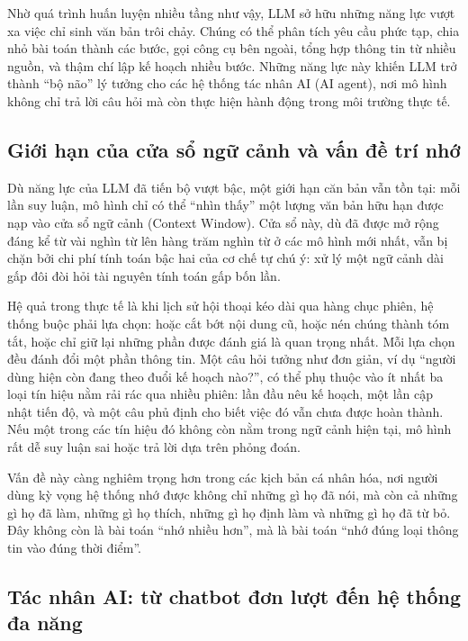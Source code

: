 \documentclass[../main.tex]{subfiles}
\begin{document}
Nhờ quá trình huấn luyện nhiều tầng như vậy, LLM sở hữu những năng lực vượt xa việc chỉ sinh văn bản trôi chảy. Chúng có thể phân tích yêu cầu phức tạp, chia nhỏ bài toán thành các bước, gọi công cụ bên ngoài, tổng hợp thông tin từ nhiều nguồn, và thậm chí lập kế hoạch nhiều bước. Những năng lực này khiến LLM trở thành ``bộ não'' lý tưởng cho các hệ thống tác nhân AI (AI agent), nơi mô hình không chỉ trả lời câu hỏi mà còn thực hiện hành động trong môi trường thực tế.

\subsection{Giới hạn của cửa sổ ngữ cảnh và vấn đề trí nhớ}

Dù năng lực của LLM đã tiến bộ vượt bậc, một giới hạn căn bản vẫn tồn tại: mỗi lần suy luận, mô hình chỉ có thể ``nhìn thấy'' một lượng văn bản hữu hạn được nạp vào cửa sổ ngữ cảnh (Context Window). Cửa sổ này, dù đã được mở rộng đáng kể từ vài nghìn từ lên hàng trăm nghìn từ ở các mô hình mới nhất, vẫn bị chặn bởi chi phí tính toán bậc hai của cơ chế tự chú ý: xử lý một ngữ cảnh dài gấp đôi đòi hỏi tài nguyên tính toán gấp bốn lần.

Hệ quả trong thực tế là khi lịch sử hội thoại kéo dài qua hàng chục phiên, hệ thống buộc phải lựa chọn: hoặc cắt bớt nội dung cũ, hoặc nén chúng thành tóm tắt, hoặc chỉ giữ lại những phần được đánh giá là quan trọng nhất. Mỗi lựa chọn đều đánh đổi một phần thông tin. Một câu hỏi tưởng như đơn giản, ví dụ ``người dùng hiện còn đang theo đuổi kế hoạch nào?'', có thể phụ thuộc vào ít nhất ba loại tín hiệu nằm rải rác qua nhiều phiên: lần đầu nêu kế hoạch, một lần cập nhật tiến độ, và một câu phủ định cho biết việc đó vẫn chưa được hoàn thành. Nếu một trong các tín hiệu đó không còn nằm trong ngữ cảnh hiện tại, mô hình rất dễ suy luận sai hoặc trả lời dựa trên phỏng đoán.

Vấn đề này càng nghiêm trọng hơn trong các kịch bản cá nhân hóa, nơi người dùng kỳ vọng hệ thống nhớ được không chỉ những gì họ đã nói, mà còn cả những gì họ đã làm, những gì họ thích, những gì họ định làm và những gì họ đã từ bỏ. Đây không còn là bài toán ``nhớ nhiều hơn'', mà là bài toán ``nhớ đúng loại thông tin vào đúng thời điểm''.

\subsection{Tác nhân AI: từ chatbot đơn lượt đến hệ thống đa năng}
\end{document}
